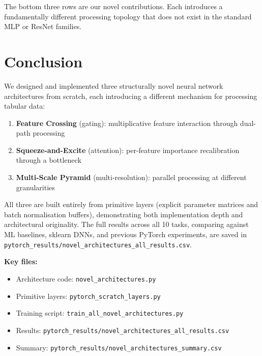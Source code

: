 \documentclass[11pt,a4paper]{article}
\begin{document}
The bottom three rows are our novel contributions. Each introduces a fundamentally different processing topology that does not exist in the standard MLP or ResNet families.

\section{Conclusion}

We designed and implemented three structurally novel neural network architectures from scratch, each introducing a different mechanism for processing tabular data:

\begin{enumerate}[leftmargin=1.2em,itemsep=0.15em]
    \item \textbf{Feature Crossing} (gating): multiplicative feature interaction through dual-path processing
    \item \textbf{Squeeze-and-Excite} (attention): per-feature importance recalibration through a bottleneck
    \item \textbf{Multi-Scale Pyramid} (multi-resolution): parallel processing at different granularities
\end{enumerate}

All three are built entirely from primitive layers (explicit parameter matrices and batch normalisation buffers), demonstrating both implementation depth and architectural originality. The full results across all 10 tasks, comparing against ML baselines, sklearn DNNs, and previous PyTorch experiments, are saved in \texttt{pytorch\_results/novel\_architectures\_all\_results.csv}.

\vspace{0.5em}
\noindent\textbf{Key files:}
\begin{itemize}[leftmargin=1.2em,itemsep=0.1em]
    \item Architecture code: \texttt{novel\_architectures.py}
    \item Primitive layers: \texttt{pytorch\_scratch\_layers.py}
    \item Training script: \texttt{train\_all\_novel\_architectures.py}
    \item Results: \texttt{pytorch\_results/novel\_architectures\_all\_results.csv}
    \item Summary: \texttt{pytorch\_results/novel\_architectures\_summary.csv}
\end{itemize}
\end{document}
